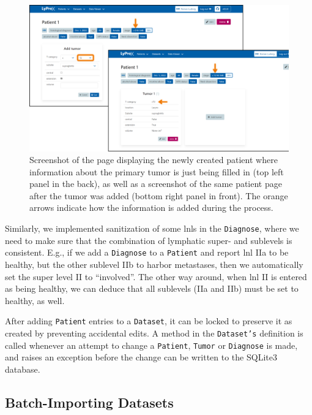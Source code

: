 \documentclass[\relativeRoot/main.tex]{subfiles}
\begin{document}
\begin{figure}
    \centering
    \includegraphics[width=1.0\textwidth]{figures/sanitize_t_stage.png}
    \caption[
        Process of adding a new tumor to a patient
    ]{
        Screenshot of the page displaying the newly created patient where information about the primary tumor is just being filled in (top left panel in the back), as well as a screenshot of the same patient page after the tumor was added (bottom right panel in front). The orange arrows indicate how the information is added during the process.
    }
    \label{fig:lyprox:sanitize_t_stage}
\end{figure}

Similarly, we implemented sanitization of some \glspl{lnl} in the \texttt{Diagnose}, where we need to make sure that the combination of lymphatic super- and sublevels is consistent. E.g., if we add a \texttt{Diagnose} to a \texttt{Patient} and report \gls{lnl} IIa to be healthy, but the other sublevel IIb to harbor metastases, then we automatically set the super level II to ``involved''. The other way around, when \gls{lnl} II is entered as being healthy, we can deduce that all sublevels (IIa and IIb) must be set to healthy, as well.

After adding \texttt{Patient} entries to a \texttt{Dataset}, it can be locked to preserve it as created by preventing accidental edits. A method in the \texttt{Dataset's} definition is called whenever an attempt to change a \texttt{Patient}, \texttt{Tumor} or \texttt{Diagnose} is made, and raises an exception before the change can be written to the SQLite3 database.

\subsection*{Batch-Importing Datasets}
\label{subsec:lyprox:implementation:batch_import}
\end{document}
